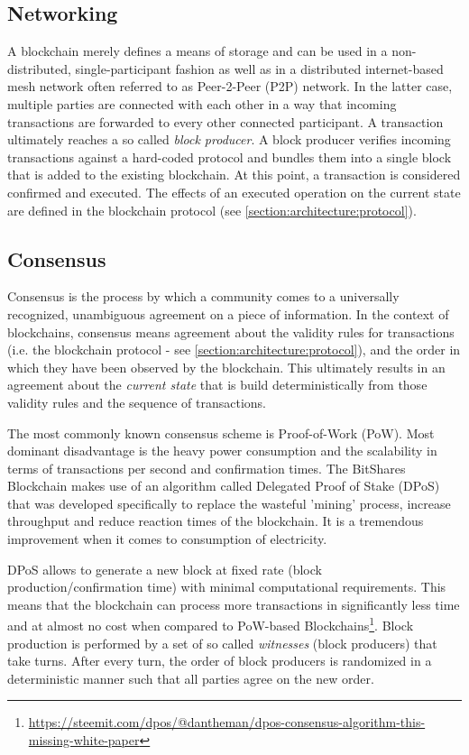 \subsection{ Networking }
\label{section:architecture:networking}

A blockchain merely defines a means of storage and can be used in a non-distributed, single-participant fashion as well as in a distributed internet-based mesh network often referred to as Peer-2-Peer (P2P) network. In the latter case, multiple parties are connected with each other in a way that incoming transactions are forwarded to every other connected participant. A transaction ultimately reaches a so called \emph{block producer}. A block producer verifies incoming transactions against a hard-coded protocol and bundles them into a single block that is added to the existing blockchain. At this point, a transaction is considered confirmed and executed. The effects of an executed operation on the current state are defined in the blockchain protocol  (see \cref{section:architecture:protocol}).

\subsection{ Consensus }
Consensus is the process by which a community comes to a universally recognized, unambiguous agreement on a piece of information. In the context of blockchains, consensus means agreement about the validity rules for transactions (i.e. the blockchain protocol - see \cref{section:architecture:protocol}), and the order in which they have been observed by the blockchain. This ultimately results in an agreement about the \emph{current state} that is build deterministically from those validity rules and the sequence of transactions.

The most commonly known consensus scheme is Proof-of-Work (PoW). Most dominant disadvantage is the heavy power consumption and the scalability in terms of transactions per second and confirmation times. The BitShares Blockchain makes use of an algorithm called Delegated Proof of Stake (DPoS) that was developed specifically to replace the wasteful 'mining' process, increase throughput and reduce reaction times of the blockchain. It is a tremendous improvement when it comes to consumption of electricity.

DPoS allows to generate a new block at fixed rate (block production/confirmation time) with minimal computational requirements. This means that the blockchain can process more transactions in significantly less time and at almost no cost when compared to PoW-based Blockchains\footnote{\url{https://steemit.com/dpos/@dantheman/dpos-consensus-algorithm-this-missing-white-paper}}. Block production is performed by a set of so called \emph{witnesses} (block producers) that take turns. After every turn, the order of block producers is randomized in a deterministic manner such that all parties agree on the new order.

